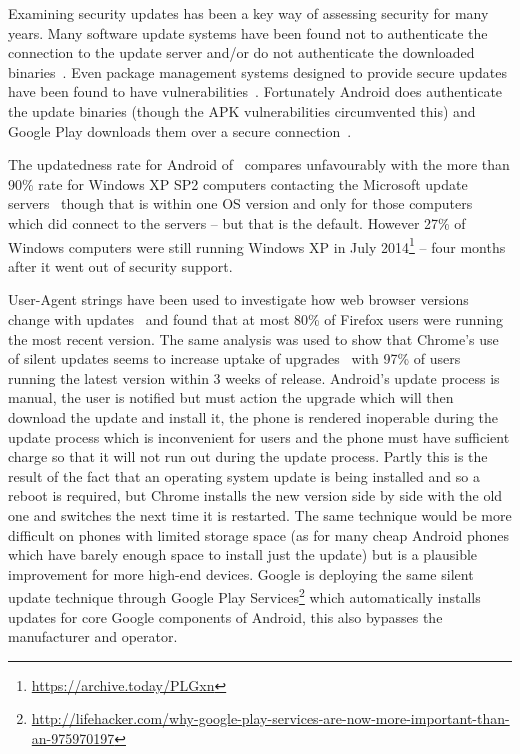 \documentclass[conference,a4paper,twoside]{IEEEtran}
\let\OldTodo\todo
\renewcommand{\todo}{\OldTodo[inline]}
\newcommand{\todolater}[1]{}%
\begin{document}
Examining security updates has been a key way of assessing security for many years.
Many software update systems have been found not to authenticate the connection to the update server and/or do not authenticate the downloaded binaries~\cite{Bellissimo2006}.
Even package management systems designed to provide secure updates have been found to have vulnerabilities~\cite{Cappos2008}.
Fortunately Android does authenticate the update binaries (though the APK vulnerabilities circumvented this) and Google Play downloads them over a secure connection~\cite{Viennot2014}.

The updatedness rate for Android of \daUpdatednessPerc\ compares unfavourably with the more than 90\% rate for Windows XP SP2 computers contacting the Microsoft update servers~\cite{Gkantsidis2006} though that is within one OS version and only for those computers which did connect to the servers -- but that is the default.
However 27\% of Windows computers were still running Windows XP in July 2014\footnote{\url{https://archive.today/PLGxn}\todolater{Get updated figures before publication}} -- four months after it went out of security support.

User-Agent strings have been used to investigate how web browser versions change with updates~\cite{Frei2008} and found that at most 80\% of Firefox users were running the most recent version.
The same analysis was used to show that Chrome's use of silent updates seems to increase uptake of upgrades~\cite{Duebendorfer2010} with 97\% of users running the latest version within 3 weeks of release.
Android's update process is manual, the user is notified but must action the upgrade which will then download the update and install it, the phone is rendered inoperable during the update process which is inconvenient for users and the phone must have sufficient charge so that it will not run out during the update process.
Partly this is the result of the fact that an operating system update is being installed and so a reboot is required, but Chrome installs the new version side by side with the old one and switches the next time it is restarted.
The same technique would be more difficult on phones with limited storage space (as for many cheap Android phones which have barely enough space to install just the update) but is a plausible improvement for more high-end devices.
Google is deploying the same silent update technique through Google Play Services\footnote{\url{http://lifehacker.com/why-google-play-services-are-now-more-important-than-an-975970197}} which automatically installs updates for core Google components of Android, this also bypasses the manufacturer and operator.
\end{document}
